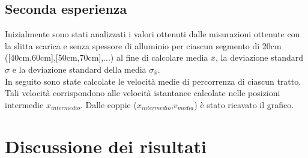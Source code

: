 \documentclass[a4paper,11pt,oneside]{article}
\begin{document}
\subsection{Seconda esperienza}
Inizialmente sono stati analizzati i valori ottenuti dalle misurazioni ottenute con la slitta scarica e senza spessore di alluminio per ciascun segmento di 20cm ([40cm,60cm],[50cm,70cm],...) al fine di calcolare media $\overline{x}$, la deviazione standard $\sigma$ e la deviazione standard della media $\sigma_{\overline{x}}$.\\
In seguito sono state calcolate le velocità medie di percorrenza di ciascun tratto. Tali velocità corrispondono alle velocità istantanee calcolate nelle posizioni intermedie $x_{intermedio}$. Dalle coppie ($x_{intermedio}$,$v_{media}$) è stato ricavato il grafico.


\section{Discussione dei risultati}
\end{document}
